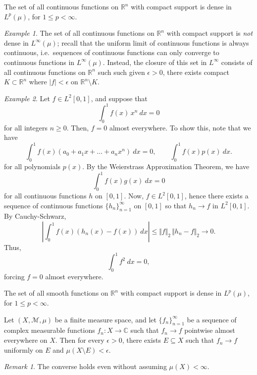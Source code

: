 \documentclass[11pt]{article}
\newcommand{\C}{\mathbb{C}}
\newcommand{\R}{\mathbb{R}}
\newcommand{\M}{\mathcal{M}}
\newcommand{\norm}[1]{\Vert #1 \Vert}
\theoremstyle{definition}
\theoremstyle{remark}
\newtheorem*{remark}{Remark}
\newtheorem*{example}{Example}
\numberwithin{equation}{section}
\begin{document}
    \begin{theorem}
        The set of all continuous functions on $\R^n$ with compact support is dense
        in $L^p(\mu)$, for $1 \leq p < \infty$.
    \end{theorem}
    \begin{example}
        The set of all continuous functions on $\R^n$ with compact support is
        \emph{not} dense in $L^\infty(\mu)$; recall that the uniform limit of
        continuous functions is always continuous, i.e.\ sequences of continuous
        functions can only converge to continuous functions in $L^\infty(\mu)$.
        Instead, the closure of this set in $L^\infty$ consists of all continuous
        functions on $\R^n$ such such given $\epsilon > 0$, there exists compact $K
        \subset \R^n$ where $|f| < \epsilon$ on $\R^n\setminus K$.
    \end{example}

    \begin{example}
        Let $f \in L^2[0, 1]$, and suppose that \[
            \int_0^1 f(x)\, x^n\:dx = 0
        \] for all integers $n \geq 0$. Then, $f = 0$ almost everywhere. To show
        this, note that we have \[
            \int_0^1 f(x)(a_0 + a_1x + \dots + a_nx^n)\:dx = 0, \qquad
            \int_0^1 f(x)p(x)\:dx.
        \] for all polynomials $p(x)$. By the Weierstrass Approximation Theorem, we
        have \[
            \int_0^1 f(x) g(x)\:dx = 0
        \] for all continuous functions $h$ on $[0, 1]$. Now, $f \in L^2[0, 1]$,
        hence there exists a sequence of continuous functions $\{h_n\}_{n =
        1}^\infty$ on $[0, 1]$ so that $h_n \to f$ in $L^2[0, 1]$. By Cauchy-Schwarz,
        \[
            \left|\int_0^1 f(x)(h_n(x) - f(x))\:dx\right| \leq \norm{f}_2\, \norm{h_n
            - f}_2 \to 0.
        \] Thus, \[
            \int_0^1 f^2\:dx = 0,
        \] forcing $f = 0$ almost everywhere.
    \end{example}

    \begin{theorem}
        The set of all smooth functions on $\R^n$ with compact support is dense in
        $L^p(\mu)$, for $1 \leq p < \infty$.
    \end{theorem}

    \begin{theorem}[Egoroff]
        Let $(X, \M, \mu)$ be a finite measure space, and let $\{f_n\}_{n =
        1}^\infty$ be a sequence of complex measurable functions $f_n \colon X \to
        \C$ such that $f_n \to f$ pointwise almost everywhere on $X$. Then for every
        $\epsilon > 0$, there exists $E \subseteq X$ such that $f_n \to f$ uniformly
        on $E$ and $\mu(X \setminus E) < \epsilon$.

        \begin{remark}
            The converse holds even without assuming $\mu(X) < \infty$.
        \end{remark}
    \end{theorem}
\end{document}
